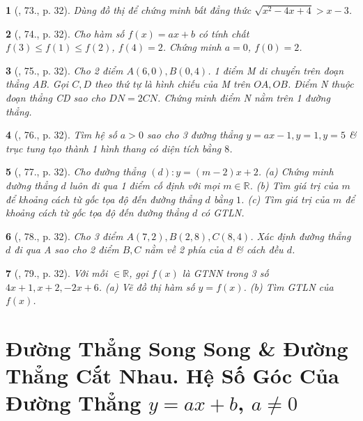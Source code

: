 \documentclass{article}
\newtheorem{baitoan}{}
\begin{document}
\begin{baitoan}[\cite{Binh_Toan_9_tap_1}, 73., p. 32]
	Dùng đồ thị để chứng minh bất đẳng thức $\sqrt{x^2 - 4x + 4} > x - 3$.
\end{baitoan}

\begin{baitoan}[\cite{Binh_Toan_9_tap_1}, 74., p. 32]
	Cho hàm số $f(x) = ax + b$ có tính chất $f(3)\le f(1)\le f(2)$, $f(4) = 2$. Chứng minh $a = 0$, $f(0) = 2$.
\end{baitoan}

\begin{baitoan}[\cite{Binh_Toan_9_tap_1}, 75., p. 32]
	Cho 2 điểm $A(6,0),B(0,4)$. 1 điểm M di chuyển trên đoạn thẳng AB. Gọi $C,D$ theo thứ tự là hình chiếu của M trên $OA,OB$. Điểm N thuộc đoạn thẳng CD sao cho $DN = 2CN$. Chứng minh điểm N nằm trên 1 đường thẳng.
\end{baitoan}

\begin{baitoan}[\cite{Binh_Toan_9_tap_1}, 76., p. 32]
	Tìm hệ số $a > 0$ sao cho 3 đường thẳng $y = ax - 1,y = 1,y = 5$ \& trục tung tạo thành 1 hình thang có diện tích bằng $8$.
\end{baitoan}

\begin{baitoan}[\cite{Binh_Toan_9_tap_1}, 77., p. 32]
	Cho đường thẳng $(d):y = (m - 2)x + 2$. (a) Chứng minh đường thẳng $d$ luôn đi qua 1 điểm cố định với mọi $m\in\mathbb{R}$. (b) Tìm giá trị của $m$ để khoảng cách từ gốc tọa độ đến đường thẳng $d$ bằng $1$. (c) Tìm giá trị của $m$ để khoảng cách từ gốc tọa độ đến đường thẳng $d$ có {\rm GTLN}.
\end{baitoan}

\begin{baitoan}[\cite{Binh_Toan_9_tap_1}, 78., p. 32]
	Cho 3 điểm $A(7,2),B(2,8),C(8,4)$. Xác định đường thẳng $d$ đi qua A sao cho 2 điểm $B,C$ nằm về 2 phía của $d$ \& cách đều $d$.
\end{baitoan}

\begin{baitoan}[\cite{Binh_Toan_9_tap_1}, 79., p. 32]
	Với mỗi $\in\mathbb{R}$, gọi $f(x)$ là {\rm GTNN} trong 3 số $4x + 1,x + 2,-2x + 6$. (a) Vẽ đồ thị hàm số $y = f(x)$. (b) Tìm {\rm GTLN} của $f(x)$.
\end{baitoan}


\section{Đường Thẳng Song Song \& Đường Thẳng Cắt Nhau. Hệ Số Góc Của Đường Thẳng $y = ax + b$, $a\ne0$}
\end{document}
